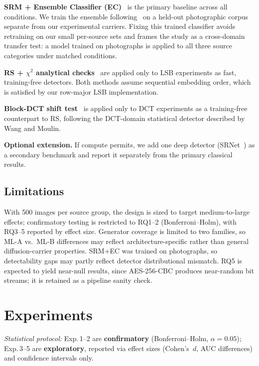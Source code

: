 \documentclass[10pt,twocolumn,a4paper]{article}
\begin{document}
\textbf{SRM + Ensemble Classifier (EC)}~\cite{fridrich2012srm,kodovsky2012ec} is the primary baseline across all conditions. We train the ensemble following~\cite{fridrich2012srm,kodovsky2012ec} on a held-out photographic corpus separate from our experimental carriers. Fixing this trained classifier avoids retraining on our small per-source sets and frames the study as a cross-domain transfer test: a model trained on photographs is applied to all three source categories under matched conditions.

\textbf{RS + $\chi^2$ analytical checks}~\cite{fridrich2001lsb,westfeld1999chi} are applied only to LSB experiments as fast, training-free detectors. Both methods assume sequential embedding order, which is satisfied by our row-major LSB implementation.

\textbf{Block-DCT shift test}~\cite{wangmoulin2003dct} is applied only to DCT experiments as a training-free counterpart to RS, following the DCT-domain statistical detector described by Wang and Moulin.

\textbf{Optional extension.} If compute permits, we add one deep detector (SRNet~\cite{boroumand2019srnet}) as a secondary benchmark and report it separately from the primary classical results.

\subsection{Limitations}

With 500 images per source group, the design is sized to target medium-to-large effects; confirmatory testing is restricted to RQ1--2 (Bonferroni--Holm), with RQ3--5 reported by effect size. Generator coverage is limited to two families, so ML-A vs.\ ML-B differences may reflect architecture-specific rather than general diffusion-carrier properties. SRM+EC was trained on photographs, so detectability gaps may partly reflect detector distributional mismatch. RQ5 is expected to yield near-null results, since AES-256-CBC produces near-random bit streams; it is retained as a pipeline sanity check.

\section{Experiments}
\label{sec:experiments}

\noindent\textit{Statistical protocol:} Exp.\,1--2 are \textbf{confirmatory} (Bonferroni--Holm, $\alpha = 0.05$); Exp.\,3--5 are \textbf{exploratory}, reported via effect sizes (Cohen's~$d$, AUC differences) and confidence intervals only.
\end{document}
